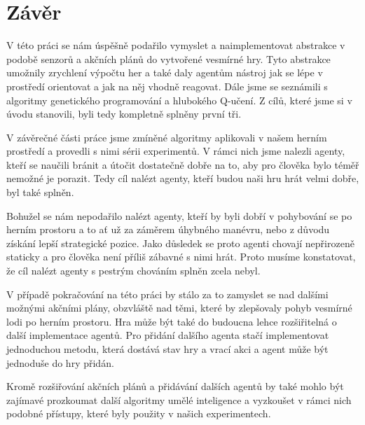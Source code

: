 \chapter*{Závěr}
V této práci se nám úspěšně podařilo vymyslet a naimplementovat abstrakce v podobě senzorů a akčních plánů do vytvořené vesmírné hry.
Tyto abstrakce umožnily zrychlení výpočtu her a také daly agentům nástroj jak se lépe v prostředí orientovat a jak na něj vhodně reagovat.
Dále jsme se seznámili s algoritmy genetického programování a hlubokého Q-učení.
Z cílů, které jsme si v úvodu stanovili, byli tedy kompletně splněny první tři.

V závěrečné části práce jsme zmíněné algoritmy aplikovali v našem herním prostředí a provedli s nimi sérii experimentů.
V rámci nich jsme nalezli agenty, kteří se naučili bránit a útočit dostatečně dobře na to, aby pro člověka bylo téměř nemožné je porazit.
Tedy cíl nalézt agenty, kteří budou naši hru hrát velmi dobře, byl také splněn.

Bohužel se nám nepodařilo nalézt agenty, kteří by byli dobří v pohybování se po herním prostoru a to ať už za záměrem úhybného manévru, nebo z důvodu získání lepší strategické pozice.
Jako důsledek se proto agenti chovají nepřirozeně staticky a pro člověka není příliš zábavné s nimi hrát.
Proto musíme konstatovat, že cíl nalézt agenty s pestrým chováním splněn zcela nebyl.

V případě pokračování na této práci by stálo za to zamyslet se nad dalšími možnými akčními plány, obzvláště nad těmi, které by zlepšovaly pohyb vesmírné lodi po herním prostoru.
Hra může být také do budoucna lehce rozšiřitelná o další implementace agentů. Pro přidání dalšího agenta stačí implementovat jednoduchou metodu, která dostává stav hry a vrací akci a agent může být jednoduše do hry přidán. 

Kromě rozšiřování akčních plánů a přidávání dalších agentů by také mohlo být zajímavé prozkoumat další algoritmy umělé inteligence a vyzkoušet v rámci nich podobné přístupy, které byly použity v našich experimentech.

